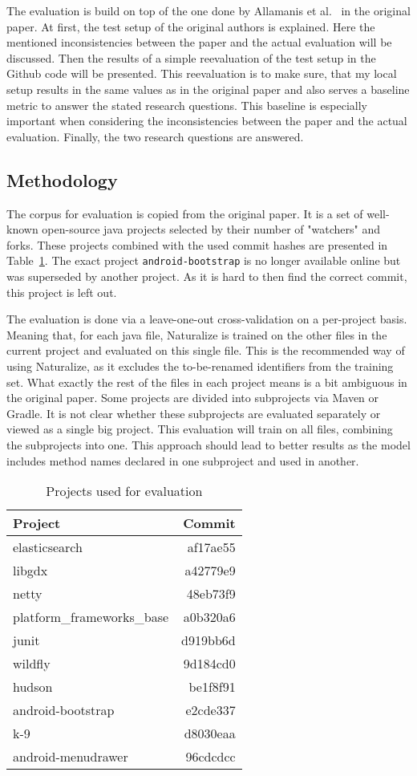 The evaluation is build on top of the one done by Allamanis et al.~\cite{naturalize} in the original paper. At first, the test setup of the original authors is explained. Here the mentioned inconsistencies between the paper and the actual evaluation will be discussed. Then the results of a simple reevaluation of the test setup in the Github code will be presented. This reevaluation is to make sure, that my local setup results in the same values as in the original paper and also serves a baseline metric to answer the stated research questions. This baseline is especially important when considering the inconsistencies between the paper and the actual evaluation. Finally, the two research questions are answered.

\subsection{Methodology}
The corpus for evaluation is copied from the original paper. It is a set of well-known open-source java
projects selected by their number of "watchers" and forks. These projects combined with the used
commit hashes are presented in Table~\ref{tab:eval_projects}. The exact project \texttt{android-bootstrap} is no
longer available online but was superseded by another project. As it is hard to then find the correct commit, this project is left out.

The evaluation is done via a leave-one-out cross-validation on a per-project basis.
Meaning that, for each java file, Naturalize is trained on the other files in the current
project and evaluated on this single file. This is the recommended way of using Naturalize, as it excludes
the to-be-renamed identifiers from the training set. What exactly the rest of the files in each project means is a bit
ambiguous in the original paper. Some projects are divided into subprojects via Maven or Gradle. It is not clear whether these subprojects are evaluated separately or viewed as a single big project. This evaluation will train on all files, combining the subprojects into one. This approach should lead to better results as the model includes method names declared in one subproject and used in another.

\begin{table}
  \caption{Projects used for evaluation}
  \label{tab:eval_projects}
  \begin{tabular}{lr}
    \toprule
    Project&Commit\\
    \midrule
    elasticsearch&af17ae55\\
    libgdx&a42779e9\\
    netty&48eb73f9\\
    platform\_frameworks\_base&a0b320a6\\
    junit&d919bb6d\\
    wildfly&9d184cd0\\
    hudson&be1f8f91\\
    android-bootstrap&e2cde337\\
    k-9&d8030eaa\\
    android-menudrawer&96cdcdcc\\
    \bottomrule
\end{tabular}
\end{table}

